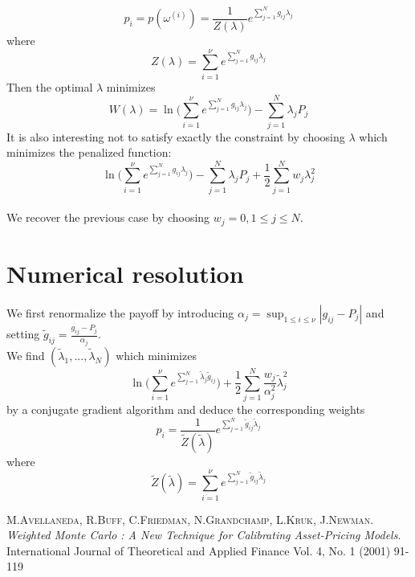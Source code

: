 \documentclass[a4paper,12pt]{article}
\begin{document}
\begin{equation*}
p_i=p(\omega^{(i)})=\frac{1}{Z(\lambda)}e^{\sum_{j=1}^{N}{g_{ij}\lambda_j}}
\end{equation*}
where
\begin{equation*}
Z(\lambda)=\sum_{i=1}^{\nu}{e^{\sum_{j=1}^{N}{g_{ij}\lambda_j}}}
\end{equation*}
Then the optimal $\lambda$ minimizes
\begin{equation*}
W(\lambda)=\ln
{\bigg(}\sum_{i=1}^{\nu}{e^{\sum_{j=1}^{N}{g_{ij}\lambda_j}}}{\bigg)}-\sum_{j=1}^{N}{\lambda_jP_j}
\end{equation*}
It is also interesting not to satisfy exactly the constraint by
choosing $\lambda$ which minimizes the penalized
function:$$\ln\bigg(\sum_{i=1}^{\nu}{e^{\sum_{j=1}^{N}{g_{ij}\lambda_j}}}\bigg)-\sum_{j=1}^{N}{\lambda_j
  P_j}+\frac{1}{2}\sum_{j=1}^{N}{w_j\lambda_j^2}$$ \\
We recover the previous case by choosing $w_j= 0 , 1 \leq j
\leq N$.
\section*{Numerical resolution}
We first renormalize the payoff by introducing $\alpha_j=\sup_{1 \leq i
  \leq \nu}|g_{ij}-P_j|$ and setting
  $\tilde{g}_{ij}=\frac{g_{ij}-P_{j}}{\alpha_j}$.\\
We find $(\tilde{\lambda}_1,...,\tilde{\lambda}_N)$ which
minimizes
  $$\ln\bigg(\sum_{i=1}^{\nu}{e^{\sum_{j=1}^{N}{\tilde{\lambda}_j\tilde{g}_{ij}}}}\bigg)+\frac{1}{2}\sum_{j=1}^{N}{
  \frac{w_j}{\alpha_j^2}\tilde{\lambda}_j^2}$$ by a conjugate gradient algorithm
  and deduce the corresponding weights $$ p_i=\frac{1}{\tilde{Z}(\tilde{\lambda})}e^{\sum_{j=1}^{N}{\tilde{g}_{ij}\tilde{\lambda}_j}}$$
where
\begin{equation*}
\tilde{Z}(\tilde{\lambda})=\sum_{i=1}^{\nu}{e^{\sum_{j=1}^{N}{\tilde{g}_{ij}\tilde{\lambda}_j}}}
\end{equation*}

\begin{thebibliography}{1}
M.\textsc{Avellaneda}, R.\textsc{Buff}, C.\textsc{Friedman},
N.\textsc{Grandchamp}, L.\textsc{Kruk}, J.\textsc{Newman}.
\emph{Weighted Monte Carlo : A New Technique for Calibrating
 Asset-Pricing Models}.
International Journal of Theoretical and Applied Finance
Vol. 4, No. 1 (2001) 91-119
\end{thebibliography}
\end{document}
